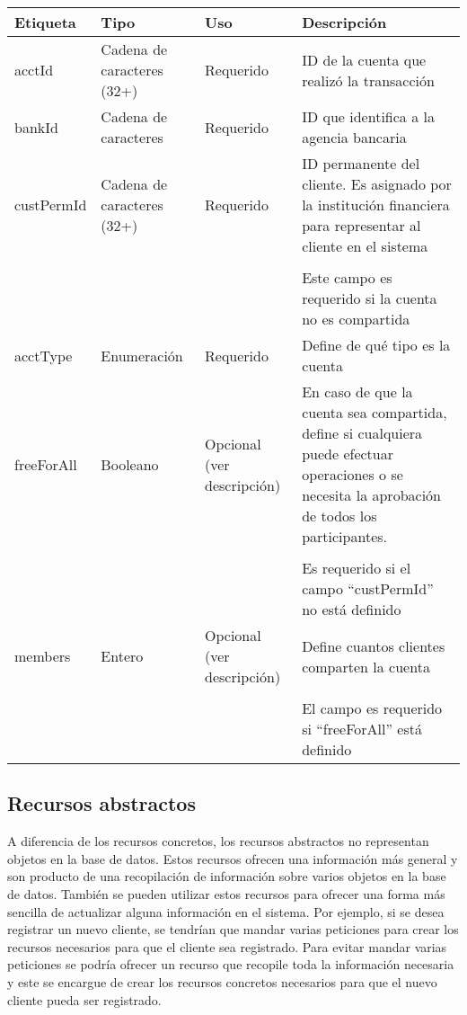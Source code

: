 \begin{center}
\begin{longtable}{|>{\centering\arraybackslash}p{}|>{\centering\arraybackslash}p{}|>{\centering\arraybackslash}p{}|>{\centering\arraybackslash}p{}|}
\hline 
\bfseries {Etiqueta} & \bfseries {Tipo} & \bfseries {Uso} & \bfseries {Descripción} \\ 
\hline
acctId & Cadena de caracteres (32+) & Requerido & ID de la cuenta que realizó la transacción \\ 
\hline 
bankId & Cadena de caracteres & Requerido & ID que identifica a la agencia bancaria \\
\hline 
custPermId & Cadena de caracteres (32+) & Requerido & ID permanente del cliente. Es asignado por la institución financiera para representar al cliente en el sistema 
\\ & & & \\
& & & Este campo es requerido si la cuenta no es compartida \\
\hline
acctType & Enumeración & Requerido & Define de qué tipo es la cuenta \\
\hline
freeForAll & Booleano & Opcional (ver descripción) & En caso de que la cuenta sea compartida, define si cualquiera puede efectuar operaciones o se necesita la aprobación de todos los participantes.
\\ & & & \\
& & & Es requerido si el campo ``custPermId'' no está definido \\
\hline 
members & Entero & Opcional (ver descripción) & Define cuantos clientes comparten la cuenta
\\ & & & \\
& & & El campo es requerido si ``freeForAll'' está definido \\
\hline 
\end{longtable}
\end{center}

\subsection{Recursos abstractos}
A diferencia de los recursos concretos, los recursos abstractos no representan objetos en la base de datos. Estos recursos ofrecen una información más general y son producto de una recopilación de información sobre varios objetos en la base de datos. También se pueden utilizar estos recursos para ofrecer una forma más sencilla de actualizar alguna información en el sistema. Por ejemplo, si se desea registrar un nuevo cliente, se tendrían que mandar varias peticiones para crear los recursos necesarios para que el cliente sea registrado. Para evitar mandar varias peticiones se podría ofrecer un recurso que recopile toda la información necesaria y este se encargue de crear los recursos concretos necesarios para que el nuevo cliente pueda ser registrado.